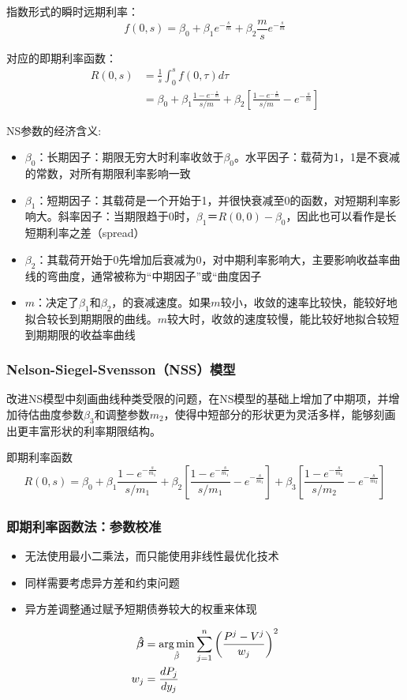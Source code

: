 \documentclass[11pt]{article}
\begin{document}
指数形式的瞬时远期利率：
\begin{equation*}
    f(0,s)=\beta_0+\beta_1 e^{-\frac{s}{m}}+\beta_2\frac{m}{s}e^{-\frac{s}{m}}
\end{equation*}

对应的即期利率函数：
\begin{align*}
    R(0,s) &= \frac{1}{s}\int^s_0 f(0,\tau)d\tau \\
    &= \beta_0 + \beta_1 \frac{1-e^{-\frac{s}{m}}}{s/m} + \beta_2\left[\frac{1-e^{-\frac{s}{m}}}{s/m} - e^{-\frac{s}{m}}\right]
\end{align*}

NS参数的经济含义:
\begin{itemize}
    \item $\beta_0$：长期因子：期限无穷大时利率收敛于$\beta_0$。水平因子：载荷为1，1是不衰减的常数，对所有期限利率影响一致
    \item $\beta_1$：短期因子：其载荷是一个开始于1，并很快衰减至0的函数，对短期利率影响大。斜率因子：当期限趋于0时，$\beta_1＝R(0,0)-\beta_0$，因此也可以看作是长短期利率之差（spread）
    \item $\beta_2$：其载荷开始于0先增加后衰减为0，对中期利率影响大，主要影响收益率曲线的弯曲度，通常被称为“中期因子”或“曲度因子
    \item $m$：决定了$\beta_1$和$\beta_2$，的衰减速度。如果$m$较小，收敛的速率比较快，能较好地拟合较长到期期限的曲线。$m$较大时，收敛的速度较慢，能比较好地拟合较短到期期限的收益率曲线
\end{itemize}

\subsubsection*{Nelson-Siegel-Svensson（NSS）模型}

改进NS模型中刻画曲线种类受限的问题，在NS模型的基础上增加了中期项，并增加待估曲度参数$\beta_3$和调整参数$m_2$，使得中短部分的形状更为灵活多样，能够刻画出更丰富形状的利率期限结构。

即期利率函数
\begin{equation*}
    R(0,s) = \beta_0 + \beta_1 \frac{1-e^{-\frac{s}{m_1}}}{s/m_1} + 
    \beta_2\left[\frac{1-e^{-\frac{s}{m_1}}}{s/m_1} - e^{-\frac{s}{m_1}}\right] +
    \beta_3\left[\frac{1-e^{-\frac{s}{m_2}}}{s/m_2} - e^{-\frac{s}{m_2}} \right]
\end{equation*}

\subsubsection*{即期利率函数法：参数校准}

\begin{itemize}
    \item 无法使用最小二乘法，而只能使用非线性最优化技术
    \item 同样需要考虑异方差和约束问题
    \item 异方差调整通过赋予短期债券较大的权重来体现
\end{itemize}

\begin{align*}
    \bm{\hat{\beta}} &= \operatorname*{arg\,min}_{\hat{\beta}} \sum^n_{j=1}\left(\frac{P^j - V^j}{w_j}\right)^2 \\
    w_j &= \frac{dP_j}{dy_j}
\end{align*}
\end{document}
